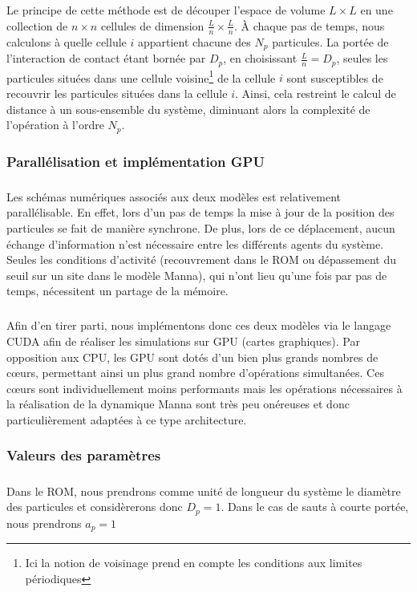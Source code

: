 \subparagraph{}Le principe de cette méthode est de découper l'espace de volume $L\times L$ en une collection de $ n \times n $ cellules de dimension $\frac{L}{n}\times \frac{L}{n}$. \`A chaque pas de temps, nous calculons à quelle cellule $i$ appartient chacune des $N_p$ particules. La portée de l'interaction de contact étant bornée par $D_p$, en choisissant $\frac{L}{n}=D_p$, seules les particules situées dans une cellule voisine\footnote{Ici la notion de voisinage prend en compte les conditions aux limites périodiques} de la cellule $i$ sont susceptibles de recouvrir les particules situées dans la cellule $i$. Ainsi, cela restreint le calcul de distance à un sous-ensemble du système, diminuant alors la complexité de l'opération à l'ordre $N_p$.

\subsubsection{Parallélisation et implémentation GPU}

\subparagraph{}Les schémas numériques associés aux deux modèles est relativement parallélisable. En effet, lors d'un pas de temps la mise à jour de la position des particules se fait de manière synchrone. De plus, lors de ce déplacement, aucun échange d'information n'est nécessaire entre les différents agents du système. Seules les conditions d'activité (recouvrement dans le ROM ou dépassement du seuil sur un site dans le modèle Manna), qui n'ont lieu qu'une fois par pas de temps, nécessitent un partage de la mémoire. 

\subparagraph{}Afin d'en tirer parti, nous implémentons donc ces deux modèles via le langage CUDA \cite{cuda} afin de réaliser les simulations sur GPU (cartes graphiques). Par opposition aux CPU, les GPU sont dotés d'un bien plus grands nombres de cœurs, permettant ainsi un plus grand nombre d'opérations simultanées. Ces cœurs sont individuellement moins performants mais les opérations nécessaires à la réalisation de la dynamique Manna sont très peu onéreuses et donc particulièrement adaptées à ce type architecture.

\subsubsection{Valeurs des paramètres}

\subparagraph{}Dans le ROM, nous prendrons comme unité de longueur du système le diamètre des particules et considèrerons donc $D_p=1$. Dans le cas de sauts à courte portée, nous prendrons $a_p=1$

